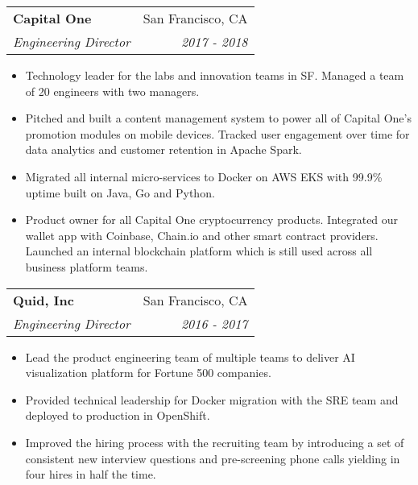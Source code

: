 \documentclass[letterpaper,11pt]{article}
\makeatletter
\newcommand{\resumeSubheading}[4]{
  \vspace{-1pt}\item
    \begin{tabular*}{0.97\textwidth}[t]{l@{\extracolsep{\fill}}r}
      \textbf{#1} & #2 \\
      \textit{\small#3} & \textit{\small #4} \\
    \end{tabular*}\vspace{-5pt}
}
\newcommand{\resumeItemListStart}{\begin{itemize}}
\newcommand{\resumeItemListEnd}{\end{itemize}\vspace{-5pt}}
\makeatother
\begin{document}
    \pagebreak[3]

    \resumeSubheading
    {Capital One}{San Francisco, CA}
    {Engineering Director}{2017 - 2018}
    \resumeItemListStart
      \item Technology leader for the labs and innovation teams in SF. Managed a team of 20 engineers with two managers.
      \item Pitched and built a content management system to power all of Capital One’s promotion modules on mobile devices. Tracked user engagement over time for data analytics and customer retention in Apache Spark.
      \item Migrated all internal micro-services to Docker on AWS EKS with 99.9\% uptime built on Java, Go and Python.
      \item Product owner for all Capital One cryptocurrency products. Integrated our wallet app with Coinbase, Chain.io and other smart contract providers. Launched an internal blockchain platform which is still used across all business platform teams.
    \resumeItemListEnd

    \pagebreak[3]

    \resumeSubheading
    {Quid, Inc}{San Francisco, CA}
    {Engineering Director}{2016 - 2017}
    \resumeItemListStart
      \item Lead the product engineering team of multiple teams to deliver AI visualization platform for Fortune 500 companies.
      \item Provided technical leadership for Docker migration with the SRE team and deployed to production in OpenShift.
      \item Improved the hiring process with the recruiting team by introducing a set of consistent new interview questions and pre-screening phone calls yielding in four hires in half the time.
    \resumeItemListEnd

    \pagebreak[3]
\end{document}
